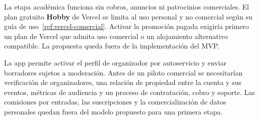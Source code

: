 La etapa académica funciona sin cobros, anuncios ni patrocinios comerciales.
El plan gratuito \textbf{Hobby} de Vercel se limita al uso personal y no
comercial según su guía de uso~\ref{ref:vercel-comercial}. Activar la promoción
pagada exigiría primero un plan de Vercel que admita uso comercial o un
alojamiento alternativo compatible. La propuesta queda fuera de la
implementación del MVP.

La app permite activar el perfil de organizador por autoservicio y enviar
borradores sujetos a moderación. Antes de un piloto comercial se necesitarían
verificación de organizadores, una relación de propiedad entre la cuenta y sus
eventos, métricas de audiencia y un proceso de contratación, cobro y soporte.
Las comisiones por entradas, las suscripciones y la comercialización de datos
personales quedan fuera del modelo propuesto para una primera etapa.

